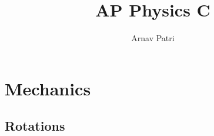 \documentclass[12pt, A4]{report}
\title{AP Physics C}
\author{Arnav Patri}
\begin{document}
	\maketitle
	\tableofcontents
	\part{Mechanics}
		\chapter{Rotations}
			
\end{document}
